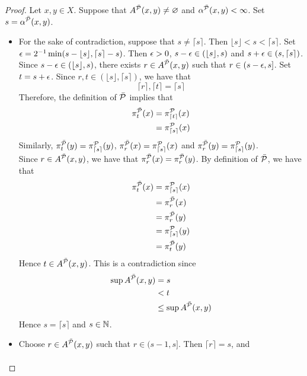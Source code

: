 \documentclass{book}
\begin{document}
\begin{proof}
	Let $x,y \in X$. Suppose that $A^{\bar{\mathcal{P}}}(x,y) \neq \varnothing$ and $\alpha^{\bar{\mathcal{P}}}(x,y) < \infty$. Set $s = \alpha^{\bar{\mathcal{P}}}(x,y)$. 
	\begin{itemize}
		\item For the sake of contradiction, suppose that $s \neq {\lceil s \rceil}$. Then ${\lfloor s \rfloor} < s <  {\lceil s \rceil}$. Set $\epsilon = 2^{-1} \min(s - {\lfloor s \rfloor}, {\lceil s \rceil} - s) $. Then $\epsilon > 0$, $s - \epsilon \in ({\lfloor s \rfloor}, s)$ and $s + \epsilon \in (s, {\lceil s \rceil})$. Since $s - \epsilon \in ({\lfloor s \rfloor}, s)$, there exists $r \in A^{\bar{\mathcal{P}}}(x,y)$ such that $r \in (s - \epsilon, s]$.
		Set $t = s + \epsilon$. Since $r, t \in ({\lfloor s \rfloor}, {\lceil s \rceil})$, we have that 
		$${\lceil r \rceil}, {\lceil t \rceil} = {\lceil s \rceil}$$
		Therefore, the definition of $\bar{\mathcal{P}}$ implies that 
		\begin{align*}
			\pi_t^{\bar{\mathcal{P}}}(x) 
			& = \pi_{\lceil t \rceil }^{\mathcal{P}}(x) \\
			& = \pi_{\lceil s \rceil }^{\mathcal{P}}(x)
		\end{align*}
		Similarly, $\pi_t^{\bar{\mathcal{P}}}(y) = \pi_{\lceil s \rceil }^{\mathcal{P}}(y)$, $\pi_r^{\bar{\mathcal{P}}}(x) = \pi_{\lceil s \rceil }^{\mathcal{P}}(x)$ and $\pi_r^{\bar{\mathcal{P}}}(y) = \pi_{\lceil s \rceil }^{\mathcal{P}}(y)$. \\
		Since $r \in A^{\bar{\mathcal{P}}}(x,y)$, we have that $\pi^{\bar{\mathcal{P}}}_r(x) = \pi^{\bar{\mathcal{P}}}_r(y)$. By definition of $\bar{\mathcal{P}}$, we have that 
		\begin{align*}
			\pi_t^{\bar{\mathcal{P}}}(x) 
			& = \pi_{\lceil s \rceil }^{\mathcal{P}}(x) \\
			& = \pi_r^{\bar{\mathcal{P}}}(x) \\
			& = \pi_r^{\bar{\mathcal{P}}}(y) \\
			& = \pi_{\lceil s \rceil }^{\mathcal{P}}(y) \\
			& = \pi_t^{\bar{\mathcal{P}}}(y) 
		\end{align*}
		Hence $t \in A^{\bar{\mathcal{P}}}(x,y)$. This is a contradiction since 
		\begin{align*}
			\sup A^{\bar{\mathcal{P}}}(x,y)
			& = s \\
			& < t \\
			& \leq \sup A^{\bar{\mathcal{P}}}(x,y)
		\end{align*}
		Hence $s = {\lceil s \rceil}$ and $s \in \mathbb{N}$.
		\item Choose $r \in A^{\bar{\mathcal{P}}}(x,y)$ such that $r \in (s-1, s]$. Then ${\lceil r \rceil } = s$, and 
		\begin{align*}

\end{align*}
\end{itemize}
\end{proof}
\end{document}
